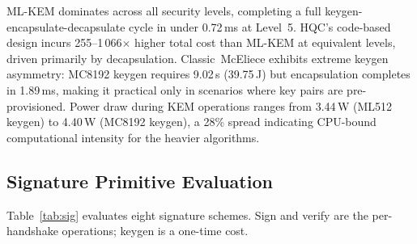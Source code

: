 ML-KEM dominates across all security levels, completing a full
keygen-encapsulate-decapsulate cycle in under 0.72\,ms at Level~5.
HQC's code-based design incurs 255--1\,066$\times$ higher total cost
than ML-KEM at equivalent levels, driven primarily by decapsulation.
Classic~McEliece exhibits extreme keygen asymmetry: MC8192 keygen
requires 9.02\,s (39.75\,J) but encapsulation completes in 1.89\,ms,
making it practical only in scenarios where key pairs are pre-provisioned.
Power draw during KEM operations ranges from 3.44\,W (ML512 keygen)
to 4.40\,W (MC8192 keygen), a 28\% spread indicating CPU-bound
computational intensity for the heavier algorithms.

\subsection{Signature Primitive Evaluation}
\label{sec:sig}

Table~\ref{tab:sig} evaluates eight signature schemes.  Sign and verify
are the per-handshake operations; keygen is a one-time cost.

